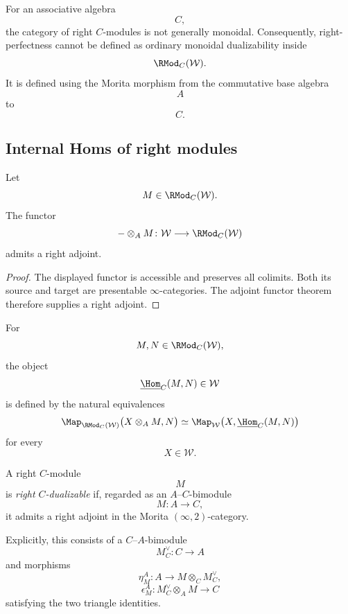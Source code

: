 For an associative algebra
\[
    C,
\]
the category of right $C$-modules is not generally monoidal.
Consequently, right-perfectness cannot be defined as ordinary monoidal
dualizability inside
\[
    \RMod_C(\mathcal W).
\]
It is defined using the Morita morphism from the commutative base algebra
\[
    A
\]
to
\[
    C.
\]

\subsection{Internal Homs of right modules}

\begin{proposition}
\label{prop:internal-hom-right-modules-exists}
Let
\[
    M\in\RMod_C(\mathcal W).
\]
The functor
\[
    -\otimes_A M
    \colon
    \mathcal W
    \longrightarrow
    \RMod_C(\mathcal W)
\]
admits a right adjoint.
\end{proposition}

\begin{proof}
The displayed functor is accessible and preserves all colimits. Both its
source and target are presentable $\infty$-categories. The adjoint
functor theorem therefore supplies a right adjoint.
\end{proof}

\begin{definition}
\label{def:internal-hom-right-modules}
For
\[
    M,N\in\RMod_C(\mathcal W),
\]
the object
\[
    \underline{\Hom}_C(M,N)
    \in
    \mathcal W
\]
is defined by the natural equivalences
\[
    \Map_{\RMod_C(\mathcal W)}
    \bigl(
        X\otimes_A M,
        N
    \bigr)
    \simeq
    \Map_{\mathcal W}
    \bigl(
        X,
        \underline{\Hom}_C(M,N)
    \bigr)
\]
for every
\[
    X\in\mathcal W.
\]
\end{definition}

\begin{definition}
\label{def:right-c-dualizable-module}
A right $C$-module
\[
    M
\]
is \emph{right $C$-dualizable} if, regarded as an
$A$--$C$-bimodule
\[
    M
    \colon
    A
    \longrightarrow
    C,
\]
it admits a right adjoint in the Morita $(\infty,2)$-category.

Explicitly, this consists of a $C$--$A$-bimodule
\[
    M_C^\vee
    \colon
    C
    \longrightarrow
    A
\]
and morphisms
\[
    \eta_M^{A}
    \colon
    A
    \longrightarrow
    M\otimes_C M_C^\vee,
\]
\[
    \epsilon_M^{A}
    \colon
    M_C^\vee\otimes_A M
    \longrightarrow
    C
\]
satisfying the two triangle identities.
\end{definition}

